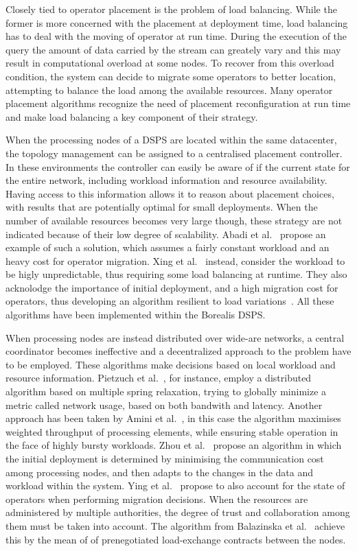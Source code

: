 Closely tied to operator placement is the problem of load balancing. While the former is more concerned with the
placement at deployment time, load balancing has to deal with the moving of operator at run time. During the
execution of the query the amount of data carried by the stream can greately vary and this may result in computational
overload at some nodes. To recover from this overload condition, the system can decide to migrate some operators to
better location, attempting to balance the load among the available resources. Many operator placement algorithms
recognize the need of placement reconfiguration at run time and make load balancing a key component of their strategy.

When the processing nodes of a DSPS are located within the same datacenter, the topology management can be assigned to a
centralised placement controller. In these environments the controller can easily be aware of if the current state for
the entire network, including workload information and resource availability. Having access to this information allows
it to reason about placement choices, with results that are potentially optimal for small deployments. When the number
of available resources becomes very large though, these strategy are not indicated because of their low degree of
scalability. Abadi et al.~\cite{borealis-design} propose an example of such a solution, which assumes a fairly constant
workload and an heavy cost for operator migration. Xing et al.~\cite{borealis-xing_placement} instead, consider the workload to
be higly unpredictable, thus requiring some load balancing at runtime. They also acknolodge the importance of initial
deployment, and a high migration cost for operators, thus developing an algorithm resilient to load
variations~\cite{borealis-load}. All these algorithms have been implemented within the Borealis DSPS. 

When processing nodes are instead distributed over wide-are networks, a central coordinator becomes ineffective and a 
decentralized approach to the problem have to be employed. These algorithms make decisions based on local workload
and resource information. Pietzuch et al.~\cite{sbon}, for instance, employ a distributed algorithm based on multiple spring
relaxation, trying to globally minimize a metric called network usage, based on both bandwith and latency. Another
approach has been taken by Amini et al.~\cite{extreme-scale-sps}, in this case the algorithm maximises weighted throughput of
processing elements, while ensuring stable operation in the face of highly bursty workloads. Zhou et al.~\cite{placement-zhou} 
propose an algorithm in which the initial deployment is determined by minimising the communication cost among
processing nodes, and then adapts to the changes in the data and workload within the system. Ying et al.~\cite{placement-ying}
propose to also account for the state of operators when performing migration decisions. When the resources are
administered by multiple authorities, the degree of trust and collaboration among them must be taken into account. 
The algorithm from Balazinska et al.~\cite{medusa-load} achieve this by the mean of of prenegotiated load-exchange contracts
between the nodes. 

